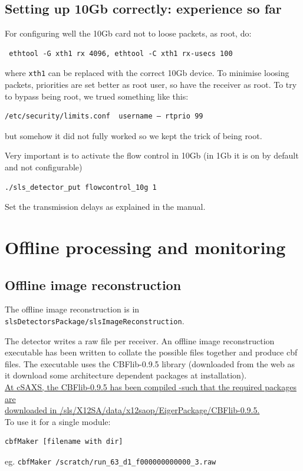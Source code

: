 \documentclass{article}
\begin{document}
\begin{itemize}
\end{itemize}
\subsection{Setting up 10Gb correctly: experience so far}

For configuring well the 10Gb card not to loose packets, as root, do:
\begin{verbatim}
 ethtool -G xth1 rx 4096, ethtool -C xth1 rx-usecs 100 
\end{verbatim}
where {\tt{xth1}} can be replaced with the correct 10Gb device. To minimise loosing packets, priorities are set better as root user, so have the receiver as root.
To try to bypass being root, we trued something like this:
\begin{verbatim}
/etc/security/limits.conf  username – rtprio 99
\end{verbatim}
but somehow it did  not fully worked  so we kept the trick of being root.

Very important is to activate the flow control in 10Gb (in 1Gb it is on by default and not configurable)
\begin{verbatim}
./sls_detector_put flowcontrol_10g 1
\end{verbatim}
Set the transmission delays as explained in the manual.

\section{Offline processing and monitoring}
\subsection{Offline image reconstruction}
The offline image reconstruction is in {\tt{slsDetectorsPackage/slsImageReconstruction}}.

The detector writes a raw file per receiver. An offline image reconstruction executable has been written to collate the possible files together and produce cbf files. The executable uses the CBFlib-0.9.5 library (downloaded from the web as it download some architecture dependent packages at installation).\\
\underline{At cSAXS, the CBFlib-0.9.5 has been compiled -such that the required packages are}\\\underline{ downloaded in /sls/X12SA/data/x12saop/EigerPackage/CBFlib-0.9.5.}\\ 

To use it for a single module:
\begin{verbatim}
cbfMaker [filename with dir]
\end{verbatim}
eg.
{\tt{cbfMaker /scratch/run\_63\_d1\_f000000000000\_3.raw}}\\
\end{document}
